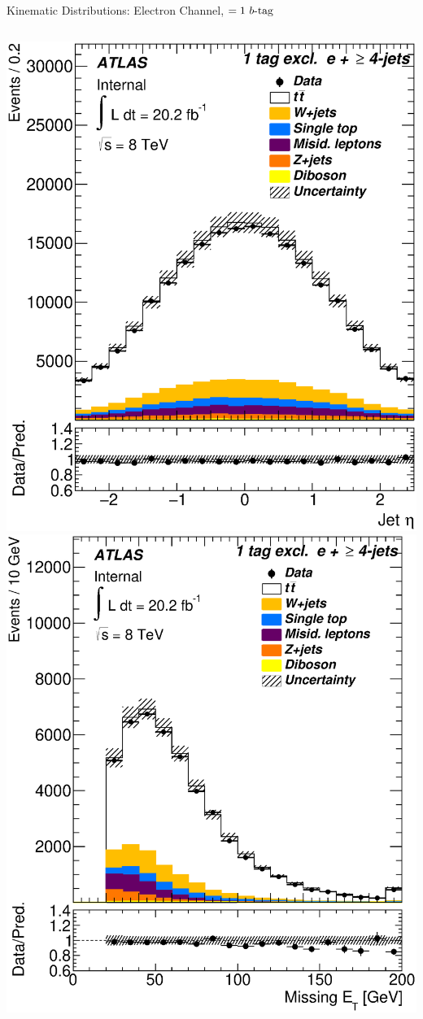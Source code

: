 \documentclass{beamer}
\begin{document}
{\begin{frame}{Kinematic Distributions: Electron Channel, $=1\text{ } \lowercase{ b\text{-tag}}$}
\begin{columns}
      \includegraphics[width=.95\textwidth]{../chapters/whel/figures/control_Plots2/bTag_1excl/JetEta_el}
      \includegraphics[width=.95\textwidth]{../chapters/whel/figures/control_Plots2/bTag_1excl/MissingEt_el}\\

\end{columns}
\end{frame}}
\end{document}
